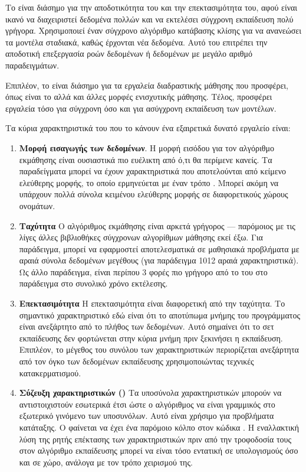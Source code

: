 Το  είναι διάσημο για την αποδοτικότητα του και την επεκτασιμότητα του, αφού είναι ικανό να διαχειριστεί δεδομένα πολλών  και να εκτελέσει σύγχρονη εκπαίδευση πολύ γρήγορα. Χρησιμοποιεί έναν σύγχρονο αλγόριθμο κατάβασης κλίσης για να ανανεώσει τα μοντέλα σταδιακά, καθώς έρχονται νέα δεδομένα. Αυτό του επιτρέπει την αποδοτική επεξεργασία ροών δεδομένων ή δεδομένων με μεγάλο αριθμό παραδειγμάτων.

Επιπλέον, το  είναι διάσημο για τα εργαλεία διαδραστικής μάθησης που προσφέρει, όπως είναι το  αλλά και άλλες μορφές ενισχυτικής μάθησης. Τέλος, προσφέρει εργαλεία τόσο για σύγχρονη όσο και για ασύγχρονη εκπαίδευση των μοντέλων.

Τα κύρια χαρακτηριστικά του  που το κάνουν ένα εξαιρετικά δυνατό εργαλείο είναι:

\begin{enumerate}
    \item \textbf{Μορφή εισαγωγής των δεδομένων}. Η μορφή εισόδου για τον αλγόριθμο εκμάθησης είναι ουσιαστικά πιο ευέλικτη από ό,τι θα περίμενε κανείς. Τα παραδείγματα μπορεί να έχουν χαρακτηριστικά που αποτελούνται από κείμενο ελεύθερης μορφής, το οποίο ερμηνεύεται με έναν τρόπο . Μπορεί ακόμη να υπάρχουν πολλά σύνολα κειμένου ελεύθερης μορφής σε διαφορετικούς χώρους ονομάτων.
    \item \textbf{Ταχύτητα} Ο αλγόριθμος εκμάθησης είναι αρκετά γρήγορος --- παρόμοιος με τις λίγες άλλες βιβλιοθήκες σύγχρονων αλγορίθμων μάθησης εκεί έξω. Για παράδειγμα, μπορεί να εφαρμοστεί αποτελεσματικά σε μαθησιακά προβλήματα με αραιά σύνολα δεδομένων μεγέθους  (για παράδειγμα 1012 αραιά χαρακτηριστικά). Ως άλλο παράδειγμα, είναι περίπου 3 φορές πιο γρήγορο από το  του  στο παράδειγμα  στο συνολικό χρόνο εκτέλεσης.
    \item \textbf{Επεκτασιμότητα} Η επεκτασιμότητα είναι διαφορετική από την ταχύτητα. Το σημαντικό χαρακτηριστικό εδώ είναι ότι το αποτύπωμα μνήμης του προγράμματος είναι ανεξάρτητο από το πλήθος των δεδομένων. Αυτό σημαίνει ότι το σετ εκπαίδευσης δεν φορτώνεται στην κύρια μνήμη πριν ξεκινήσει η εκπαίδευση. Επιπλέον, το μέγεθος του συνόλου των χαρακτηριστικών περιορίζεται ανεξάρτητα από τον όγκο των δεδομένων εκπαίδευσης χρησιμοποιώντας τεχνικές κατακερματισμού.
    \item \textbf{Σύζευξη χαρακτηριστικών ()} Τα υποσύνολα χαρακτηριστικών μπορούν να αντιστοιχιστούν εσωτερικά έτσι ώστε ο αλγόριθμος να είναι γραμμικός στο εξωτερικό γινόμενο των υποσυνόλων. Αυτό είναι χρήσιμο για προβλήματα κατάταξης. Ο  φαίνεται να έχει ένα παρόμοιο κόλπο στον κώδικα . Η εναλλακτική λύση της ρητής επέκτασης των χαρακτηριστικών πριν από την τροφοδοσία τους στον αλγόριθμο εκπαίδευσης μπορεί να είναι τόσο εντατική σε υπολογισμούς όσο και σε χώρο, ανάλογα με τον τρόπο χειρισμού της.
\end{enumerate}

